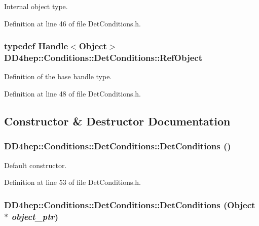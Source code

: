 Internal object type. 

Definition at line 46 of file DetConditions.h.\hypertarget{class_d_d4hep_1_1_conditions_1_1_det_conditions_ab958ffc02b500f3404f001bec0eca780}{
\subsubsection[{RefObject}]{\setlength{\rightskip}{0pt plus 5cm}typedef {\bf Handle}$<${\bf Object}$>$ {\bf DD4hep::Conditions::DetConditions::RefObject}}}
\label{class_d_d4hep_1_1_conditions_1_1_det_conditions_ab958ffc02b500f3404f001bec0eca780}


Definition of the base handle type. 

Definition at line 48 of file DetConditions.h.

\subsection{Constructor \& Destructor Documentation}
\hypertarget{class_d_d4hep_1_1_conditions_1_1_det_conditions_a9a4cde83aa738c3970fd1cfe2e77f3b0}{
\subsubsection[{DetConditions}]{\setlength{\rightskip}{0pt plus 5cm}DD4hep::Conditions::DetConditions::DetConditions ()}}
\label{class_d_d4hep_1_1_conditions_1_1_det_conditions_a9a4cde83aa738c3970fd1cfe2e77f3b0}


Default constructor. 

Definition at line 53 of file DetConditions.h.\hypertarget{class_d_d4hep_1_1_conditions_1_1_det_conditions_a54b5cab9b9fca16db159c7f2cf5a4023}{
\subsubsection[{DetConditions}]{\setlength{\rightskip}{0pt plus 5cm}DD4hep::Conditions::DetConditions::DetConditions ({\bf Object} $\ast$ {\em object\_\-ptr})}}
\label{class_d_d4hep_1_1_conditions_1_1_det_conditions_a54b5cab9b9fca16db159c7f2cf5a4023}


